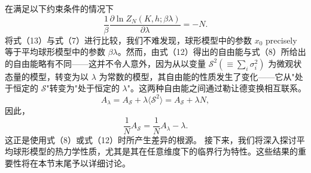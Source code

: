在满足以下约束条件的情况下
\begin{equation}\tag{13.4.42}\label{eq:13.4.42}
\frac { 1 } { \beta } \frac { \partial \ln Z _ { N } ( K , h ; \beta \lambda ) } { \partial \lambda } = - N .
\end{equation}
将式（13）与式（7）进行比较，我们不难发现，球形模型中的参数 \(x_{0}\) precisely 等于平均球形模型中的参数 \(\beta\lambda\)。然而，由式（12）得出的自由能与式（8）所给出的自由能略有不同——这并不令人意外，因为从以变量 \(\mathcal{S}^{2}(\equiv\sum_{i}\sigma_{i}^{2})\) 为微观状态量的模型，转变为以 \(\lambda\) 为常数的模型，其自由能的性质发生了变化——它从"处于恒定的 \(\mathcal{S}\)"转变为"处于恒定的 \(\lambda\)"。这两种自由能之间通过勒让德变换相互联系。
\begin{equation}\tag{13.4.43}\label{eq:13.4.43}
A _ { \lambda } = A _ { \mathcal { S } } + \lambda \langle \mathcal { S } ^{2} \rangle = A _ { \mathcal { S } } + \lambda N ,
\end{equation}
因此，
\begin{equation}\tag{13.4.44}\label{eq:13.4.44}
\frac { 1 } { N } A _ { \mathcal { S } } = \frac { 1 } { N } A _ { \lambda } - \lambda .
\end{equation}
这正是使用式（8）或式（12）时所产生差异的根源。
接下来，我们将深入探讨平均球形模型的热力学性质，尤其是其在任意维度下的临界行为特性。这些结果的重要性将在本节末尾予以详细讨论。
